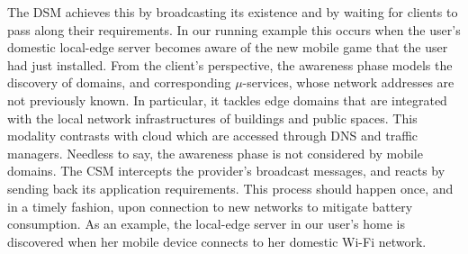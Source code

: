 The DSM achieves this by broadcasting its existence and by waiting for clients to pass along their requirements. In our running example this occurs when the user's domestic local-edge server becomes aware of the new mobile game that the user had just installed. 
From the client's perspective, the awareness phase models the discovery of domains, and corresponding $\mu$-services, whose network addresses are not previously known. In particular, it tackles edge domains that are integrated with the local network infrastructures of buildings and public spaces. This modality contrasts with cloud which are accessed through DNS and traffic managers. Needless to say, the awareness phase is not considered by mobile domains. The CSM intercepts the provider's broadcast messages, and reacts by sending back its application requirements. This process should happen once, and in a timely fashion, upon connection to new networks to mitigate battery consumption. As an example, the local-edge server in our user's home is discovered when her mobile device connects to her domestic Wi-Fi network. 






